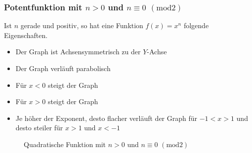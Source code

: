 \subsubsection{Potentfunktion mit $n>0 $ und $ n\equiv0$ $(\mathrm{mod}2)$}
Ist $n$ gerade und positiv, so hat eine Funktion $f(x)=x	^n$ folgende Eigenschaften.
\begin{itemize}
	\item Der Graph ist Achsensymmetrisch zu der $Y$-Achse
	\item Der Graph verläuft parabolisch
	\item Für $x<0$ steigt der Graph
	\item Für $x>0$ steigt der Graph
	\item Je höher der Exponent, desto flacher verläuft der Graph für $-1<x>1$ und desto steiler für $x>1$ und $x<-1$
\end{itemize}
\begin{figure}[h]
\centering
{}
\caption{Quadratische Funktion mit $n>0$ und $ n\equiv0$ $(\mathrm{mod}2)$}
\end{figure}
